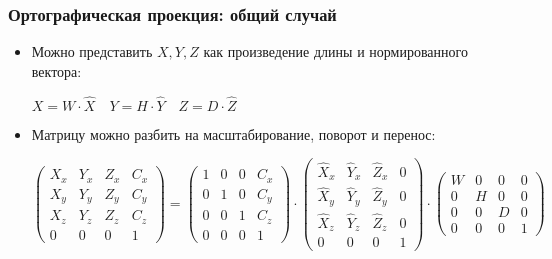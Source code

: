 \documentclass{beamer}
\begin{document}
\begin{frame}[fragile]
\frametitle{Ортографическая проекция: общий случай}
\begin{itemize}
\item Можно представить \begin{math}X, Y, Z\end{math} как произведение длины и нормированного вектора:
\begin{center}
\begin{math}X = W \cdot \hat X \quad Y = H \cdot \hat Y \quad Z = D \cdot \hat Z\end{math}
\end{center}
\pause
\item Матрицу можно разбить на масштабирование, поворот и перенос:
\begin{center}
\begin{math}
\begin{pmatrix}
X_x & Y_x & Z_x & C_x \\
X_y & Y_y & Z_y & C_y \\
X_z & Y_z & Z_z & C_z \\
0 & 0 & 0 & 1
\end{pmatrix}
=
\begin{pmatrix}
1 & 0 & 0 & C_x \\
0 & 1 & 0 & C_y \\
0 & 0 & 1 & C_z \\
0 & 0 & 0 & 1
\end{pmatrix}
\cdot
\begin{pmatrix}
\hat X_x & \hat Y_x & \hat Z_x & 0 \\
\hat X_y & \hat Y_y & \hat Z_y & 0 \\
\hat X_z & \hat Y_z & \hat Z_z & 0 \\
0 & 0 & 0 & 1
\end{pmatrix}
\cdot
\begin{pmatrix}
W & 0 & 0 & 0 \\
0 & H & 0 & 0 \\
0 & 0 & D & 0 \\
0 & 0 & 0 & 1
\end{pmatrix}
\end{math}
\end{center}
\end{itemize}
\end{frame}
\end{document}
